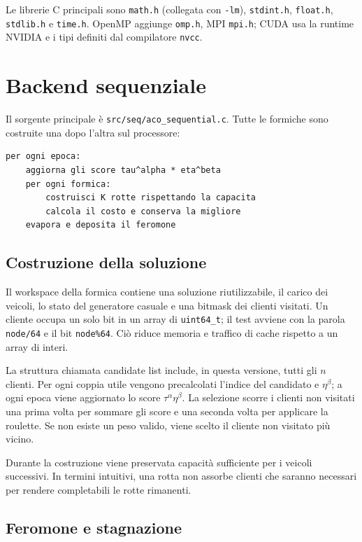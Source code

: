 \documentclass[11pt,a4paper]{article}
\begin{document}
Le librerie C principali sono \texttt{math.h} (collegata con \texttt{-lm}),
\texttt{stdint.h}, \texttt{float.h}, \texttt{stdlib.h} e \texttt{time.h}.
OpenMP aggiunge \texttt{omp.h}, MPI \texttt{mpi.h}; CUDA usa la runtime NVIDIA e
i tipi definiti dal compilatore \texttt{nvcc}.

\section{Backend sequenziale}

Il sorgente principale è \texttt{src/seq/aco\_sequential.c}. Tutte le formiche
sono costruite una dopo l'altra sul processore:
\begin{lstlisting}
per ogni epoca:
    aggiorna gli score tau^alpha * eta^beta
    per ogni formica:
        costruisci K rotte rispettando la capacita
        calcola il costo e conserva la migliore
    evapora e deposita il feromone
\end{lstlisting}

\subsection{Costruzione della soluzione}

Il workspace della formica contiene una soluzione riutilizzabile, il carico dei
veicoli, lo stato del generatore casuale e una bitmask dei clienti visitati. Un
cliente occupa un solo bit in un array di \texttt{uint64\_t}; il test avviene
con la parola \texttt{node/64} e il bit \texttt{node\%64}. Ciò riduce memoria e
traffico di cache rispetto a un array di interi.

La struttura chiamata candidate list include, in questa versione, tutti gli
$n$ clienti. Per ogni coppia utile vengono precalcolati l'indice del candidato e
$\eta^\beta$; a ogni epoca viene aggiornato lo score $\tau^\alpha\eta^\beta$.
La selezione scorre i clienti non visitati una prima volta per sommare gli score
e una seconda volta per applicare la roulette. Se non esiste un peso valido,
viene scelto il cliente non visitato più vicino.

Durante la costruzione viene preservata capacità sufficiente per i veicoli
successivi. In termini intuitivi, una rotta non assorbe clienti che saranno
necessari per rendere completabili le rotte rimanenti.

\subsection{Feromone e stagnazione}
\end{document}
